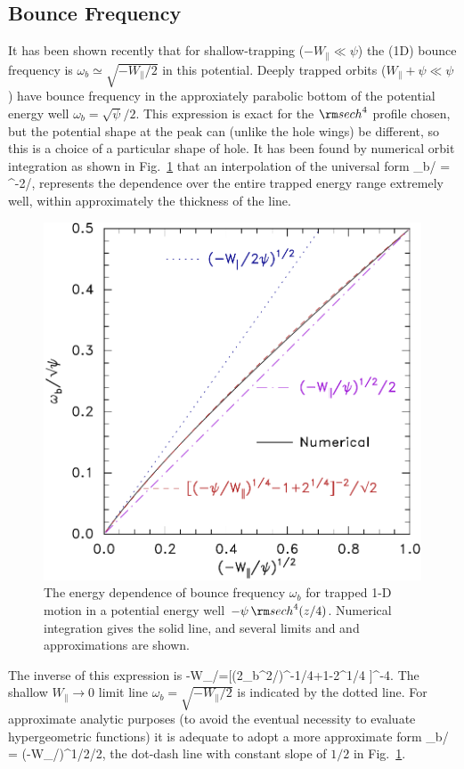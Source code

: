\documentclass[draft,jgrga]{agutex}
\let\oldequation\equation
\let\oldendequation\endequation
\renewenvironment{equation}
  {\linenomathNonumbers\oldequation}
  {\oldendequation\endlinenomath}
\begin{document}
\begin{article}
\subsection{Bounce Frequency}
It has been shown recently \citep{Hutchinson2019a} that for shallow-trapping
($-W_\parallel\ll \psi$) the (1D) bounce frequency is
$\omega_b\simeq \sqrt{-W_\parallel/2}$ in this potential. Deeply
trapped orbits ($W_\parallel+\psi \ll \psi$) have bounce frequency in
the approxiately parabolic bottom of the potential energy well
$\omega_b=\sqrt{\psi}/2$. This expression is exact for the
${\rm sech}^4$ profile chosen, but the potential shape at the peak can
(unlike the hole wings) be different, so this is a choice of a
particular shape of hole.
It has been found by numerical orbit integration as shown in Fig.\
\ref{fig:omegabvW} that an interpolation of the universal form
\begin{equation}
  \label{eq:omegainterp}
  \omega_b/\sqrt{\psi} = 
^{-2}/,
\end{equation}
represents the dependence over the entire trapped energy range
extremely well, within approximately the thickness of the line. 
\begin{figure}%
  \centering
  \includegraphics[width=0.6\hsize]{omvwnext}
  \caption{The energy dependence of bounce frequency $\omega_b$ for
    trapped 1-D motion in a potential energy well
    $-\psi\,{\rm sech}^4(z/4)$. Numerical integration gives the solid
    line, and several limits and and approximations are shown.}
  \label{fig:omegabvW}
\end{figure}
The inverse of this expression is 
\begin{equation}
  \label{eq:omegainverse}
  -W_\parallel/\psi=[(2\omega_b^2/\psi)^{-1/4}+1-2^{1/4} ]^{-4}.
\end{equation}
The
shallow $W_\parallel \to 0$ limit line
$\omega_b= \sqrt{-W_\parallel/2}$ is indicated by the dotted line. 
For
approximate analytic purposes (to avoid the eventual necessity to
evaluate hypergeometric functions) it is adequate to adopt a more
approximate form
\begin{equation}
  \label{eq:omegaapprox}
  \omega_b/\sqrt{\psi} = (-W_\parallel/\psi)^{1/2}/2,
\end{equation}
the dot-dash line with constant slope of $1/2$  in Fig.\ \ref{fig:omegabvW}.


\end{article}
\end{document}

